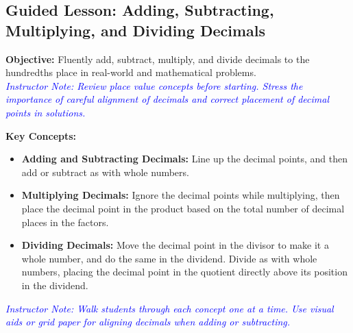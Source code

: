 \documentclass[12pt]{article}
\title{}
\date{}
\begin{document}
\subsection*{Guided Lesson: Adding, Subtracting, Multiplying, and Dividing Decimals}
\onehalfspacing

\begin{tcolorbox}[colframe=black!40, colback=gray!5, 
coltitle=black, colbacktitle=black!20, fonttitle=\bfseries\Large, 
title=Learning Objective, halign title=center, left=5pt, right=5pt, top=5pt, bottom=15pt]
\textbf{Objective:} Fluently add, subtract, multiply, and divide decimals to the hundredths place in real-world and mathematical problems.\\
\textcolor{blue}{\textit{Instructor Note: Review place value concepts before starting. Stress the importance of careful alignment of decimals and correct placement of decimal points in solutions.}}
\end{tcolorbox}

\begin{tcolorbox}[colframe=black!60, colback=white, 
coltitle=black, colbacktitle=black!15, fonttitle=\bfseries\Large, 
title=Key Concepts and Vocabulary, halign title=center, left=10pt, right=10pt, top=10pt, bottom=15pt]
\textbf{Key Concepts:}
\begin{itemize}
    \item \textbf{Adding and Subtracting Decimals:} Line up the decimal points, and then add or subtract as with whole numbers.
    \item \textbf{Multiplying Decimals:} Ignore the decimal points while multiplying, then place the decimal point in the product based on the total number of decimal places in the factors.
    \item \textbf{Dividing Decimals:} Move the decimal point in the divisor to make it a whole number, and do the same in the dividend. Divide as with whole numbers, placing the decimal point in the quotient directly above its position in the dividend.
\end{itemize}
\textcolor{blue}{\textit{Instructor Note: Walk students through each concept one at a time. Use visual aids or grid paper for aligning decimals when adding or subtracting.}}
\end{tcolorbox}
\end{document}
